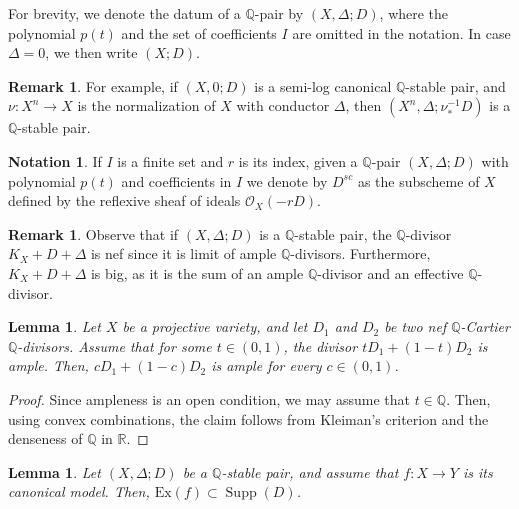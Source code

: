 \documentclass{amsart}
\newcommand{\bQ}{\mathbb{Q}}
\newcommand{\supp}{\operatorname{Supp}}
\newtheorem{Lemma}[theorem]{Lemma}
\theoremstyle{definition}
\newtheorem{Notation}[theorem]{Notation}
\newtheorem{Remark}[theorem]{Remark}
\newcommand{\rar}{\rightarrow}
\def\O#1.{\mathcal {O}_{#1}}
\renewcommand{\qq}{\mathbb{Q}}
\begin{document}
For brevity, we denote the datum of a $\bQ$-pair by $(X,\Delta;D)$, where the polynomial $p(t)$ and the set of coefficients $I$ are omitted in the notation.
In case $\Delta=0$, we then write $(X;D)$.
\begin{Remark}
For example, if $(X,0;D)$ is a semi-log canonical $\bQ$-stable pair, and $\nu \colon X^n\to X$ is the normalization of $X$ with conductor $\Delta$, then $(X^n,\Delta;\nu_*^{-1}D)$ is a $\bQ$-stable pair.
\end{Remark}

\begin{Notation}\label{notation_Dsc}
If $I$ is a finite set and $r$ is its index, given a $\bQ$-pair $(X,\Delta;D)$ with polynomial $p(t)$ and coefficients in $I$ we denote by $D^{sc}$ as the subscheme of $X$ defined by the reflexive sheaf of ideals $\O X.(-rD)$.
\end{Notation}


\begin{Remark}\label{remark_KX+D+delta_is_nef}
Observe that if $(X,\Delta;D)$ is a $\bQ$-stable pair, the $\qq$-divisor $K_X+D+\Delta$ is nef since it is limit of ample $\qq$-divisors.
Furthermore, $K_X+D+\Delta$ is big, as it is the sum of an ample $\qq$-divisor and an effective $\qq$-divisor.
\end{Remark}

\begin{Lemma} \label{lemma_convex_combination}
Let $X$ be a projective variety, and let $D_1$ and $D_2$ be two nef $\bQ$-Cartier $\bQ$-divisors.
Assume that for some $t \in (0,1)$, the divisor $tD_1 + (1-t)D_2$ is ample.
Then, $cD_1 + (1-c)D_2$ is ample for every $c \in (0,1)$.
\end{Lemma}

\begin{proof}
Since ampleness is an open condition, we may assume that $t \in \mathbb Q$.
Then, using convex combinations, the claim follows from Kleiman's criterion and the denseness of $ \mathbb{Q}$ in $\mathbb{R}$.
\end{proof}


\begin{Lemma} \label{ample model p-pair}
Let $(X,\Delta;D)$ be a $\bQ$-stable pair, and assume that $f \colon X \rar Y$ is its canonical model.
Then, $\mathrm{Ex}(f) \subset \supp(D)$.
\end{Lemma}
\end{document}
